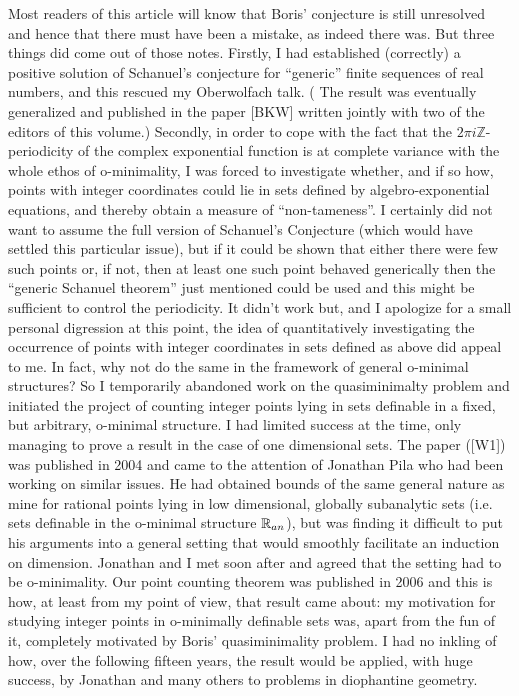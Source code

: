 \documentclass[12pt,nodate]{article}
\begin{document}
\vspace{3mm}

Most readers of this article will know that Boris' conjecture is still unresolved and hence that there must have been a mistake, as indeed there was. But three things did come out of those notes. Firstly, I had established (correctly) a positive solution of Schanuel's conjecture for ``generic'' finite sequences of real numbers, and this rescued my Oberwolfach talk. ( The result was eventually generalized and published in the paper [BKW] written jointly with two of the editors of this volume.) Secondly,  in order to cope with the fact that the $2\pi i \mathbb{Z}$-periodicity of the complex exponential function is at complete variance with the whole ethos of o-minimality, I was forced to investigate whether, and if so how, points with  integer coordinates could lie in sets defined by algebro-exponential equations, and thereby obtain a measure of ``non-tameness''. I certainly did not want to assume the full version of Schanuel's Conjecture (which would have settled this particular issue), but if it could be shown that either there were few such points or, if not, then at least one such point behaved generically then the ``generic Schanuel theorem'' just mentioned could be used and this might be sufficient to control the periodicity. It didn't work but, and I apologize for a small personal digression at this point,  the idea of quantitatively investigating the occurrence of points with integer coordinates in sets defined as above did appeal to me. In fact, why not do the same in the framework of general o-minimal structures? So I temporarily abandoned work on the quasiminimalty problem and initiated the project of counting integer points lying in sets definable in a fixed, but arbitrary, o-minimal structure. I had limited success at the time, only managing to prove a result in the case of one dimensional sets. The paper ([W1]) was published in 2004 and came to the attention of Jonathan Pila who had been working on  similar issues. He had obtained bounds of the same general nature as mine for rational points lying in low dimensional, globally subanalytic sets (i.e. sets definable in the o-minimal structure $\mathbb{R} _{an}$), but was finding it difficult to put his arguments into a general setting that would smoothly facilitate an induction on dimension. Jonathan and I met soon after and agreed that the setting had to be o-minimality. Our point counting theorem was published in 2006 and this is how, at least from my point of view, that result came about: my motivation for studying integer points in o-minimally definable sets was, apart from the fun of it, completely motivated by Boris' quasiminimality problem.  
I had no inkling of how, over the following fifteen years, the result would be applied, with huge success, by Jonathan and many others to problems in diophantine geometry. 
\end{document}

